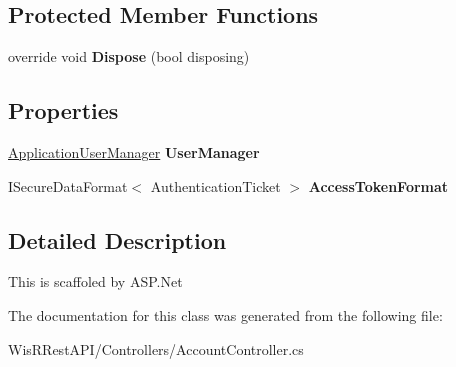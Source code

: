 \subsection*{Protected Member Functions}
\begin{DoxyCompactItemize}
\item 
\hypertarget{class_wis_r_rest_a_p_i_1_1_controllers_1_1_account_controller_a9c5bf272cf191e30061baddaf117664e}{}override void {\bfseries Dispose} (bool disposing)\label{class_wis_r_rest_a_p_i_1_1_controllers_1_1_account_controller_a9c5bf272cf191e30061baddaf117664e}

\end{DoxyCompactItemize}
\subsection*{Properties}
\begin{DoxyCompactItemize}
\item 
\hypertarget{class_wis_r_rest_a_p_i_1_1_controllers_1_1_account_controller_a0a54481ae231c560512f9ca711f144a9}{}\hyperlink{class_wis_r_rest_a_p_i_1_1_application_user_manager}{Application\+User\+Manager} {\bfseries User\+Manager}\label{class_wis_r_rest_a_p_i_1_1_controllers_1_1_account_controller_a0a54481ae231c560512f9ca711f144a9}

\item 
\hypertarget{class_wis_r_rest_a_p_i_1_1_controllers_1_1_account_controller_adc0038dd7711bed0e05d4b79f8080b56}{}I\+Secure\+Data\+Format$<$ Authentication\+Ticket $>$ {\bfseries Access\+Token\+Format}\label{class_wis_r_rest_a_p_i_1_1_controllers_1_1_account_controller_adc0038dd7711bed0e05d4b79f8080b56}

\end{DoxyCompactItemize}


\subsection{Detailed Description}
This is scaffoled by A\+S\+P.\+Net 



The documentation for this class was generated from the following file\+:\begin{DoxyCompactItemize}
\item 
Wis\+R\+Rest\+A\+P\+I/\+Controllers/Account\+Controller.\+cs\end{DoxyCompactItemize}
